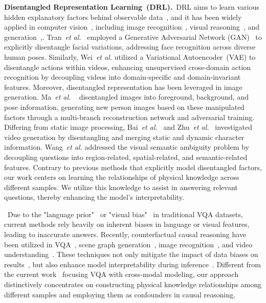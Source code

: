 \noindent
{\bf Disentangled Representation Learning~(DRL).}~DRL aims to learn various hidden explanatory factors behind observable data~\cite{bengio2013representation}, and it has been widely applied in computer vision~\cite{chen2021curriculum}, including image recognition~\cite{wei2024unsupervised,qi2020stc}, visual reasoning~\cite{van2019disentangled,qi2021semantics}, and generation~\cite{ma2018disentangled, bai2021contrastively, wang2024rdfc,qi2019attentive,qi2019ke},. Tran~{\it et al.}~\cite{tran2017disentangled} employed a Generative Adversarial Network (GAN)~\cite{goodfellow2020generative} to explicitly disentangle facial variations, addressing face recognition across diverse human poses.  Similarly, Wei~{\it et al.}\cite{wei2024unsupervised} utilized a Variational Autoencoder~(VAE) to disentangle actions within videos, enhancing unsupervised cross-domain action recognition by decoupling videos into domain-specific and domain-invariant features. Moreover, disentangled representation has been leveraged in image generation. Ma~{\it et al.} ~\cite{ma2018disentangled} disentangled images into foreground, background, and pose information, generating new person images based on these manipulated factors through a multi-branch reconstruction network and adversarial training. Differing from static image processing, Bai~{\it et al.}~\cite{bai2021contrastively} and Zhu~{\it et al.}~\cite{zhu2020s3vae} investigated video generation by disentangling and merging static and dynamic character information. Wang~{\it et al.}\cite{wang2023disavr} addressed the visual semantic ambiguity problem by decoupling questions into region-related, spatial-related, and semantic-related features. Contrary to previous methods that explicitly model disentangled factors, our work centers on learning the relationships of physical knowledge across different samples. We utilize this knowledge to assist in answering relevant questions, thereby enhancing the model's interpretability.


~Due to the "language prior"~\cite{goyal2017making} or "visual  bias"~\cite{antol2015vqa} in traditional VQA datasets, current methods rely heavily on inherent biases in language or visual features, leading to inaccurate answers. Recently, counterfactual causal reasoning have been utilized in VQA~\cite{goyal2019counterfactual}, scene graph generation~\cite{tang2020unbiased}, image recognition~\cite{Rao_2021_ICCV}, and video understanding~\cite{xu2022unintentional}.  These techniques not only mitigate the impact of data biases on results~\cite{sun2023unbiased}, but also enhance model interpretability during inference~\cite{xue2023variational}. Different from the current work~\cite{li2023progressive} focusing VQA with cross-modal modeling, our approach distinctively concentrates on constructing physical knowledge relationships among different samples and employing them as confounders in causal reasoning.

